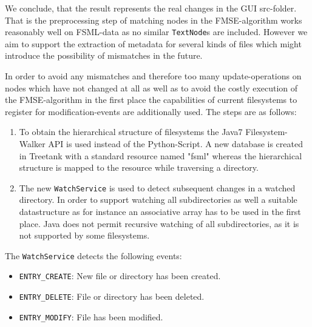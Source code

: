 We conclude, that the result represents the real changes in the GUI src-folder. That is the preprocessing step of matching nodes in the FMSE-algorithm works reasonably well on FSML-data as no similar \texttt{TextNode}s are included. However we aim to support the extraction of metadata for several kinds of files which might introduce the possibility of mismatches in the future.

In order to avoid any mismatches and therefore too many update-operations on nodes which have not changed at all as well as to avoid the costly execution of the FMSE-algorithm in the first place the capabilities of current filesystems to register for modification-events are additionally used. The steps are as follows:

\begin{enumerate}
\item To obtain the hierarchical structure of filesystems the Java7 Filesystem-Walker API is used instead of the Python-Script. A new database is created in Treetank with a standard resource named "fsml" whereas the hierarchical structure is mapped to the resource while traversing a directory. 
\item The new \texttt{WatchService} is used to detect subsequent changes in a watched directory. In order to support watching all subdirectories as well a suitable datastructure as for instance an associative array has to be used in the first place. Java does not permit recursive watching of all subdirectories, as it is not supported by some filesystems.
\end{enumerate}

The \texttt{WatchService} detects the following events:

\begin{itemize}
\item \texttt{ENTRY\_CREATE}: New file or directory has been created.
\item \texttt{ENTRY\_DELETE}: File or directory has been deleted.
\item \texttt{ENTRY\_MODIFY}: File has been modified.
\end{itemize}

